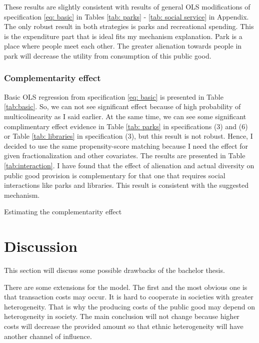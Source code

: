 \documentclass[letterpaper,11pt]{article}
\begin{document}
These results are slightly consistent with results of general OLS modifications of specification \ref{eq: basic} in Tables \ref{tab: parks} - \ref{tab: social service} in Appendix. The only robust result in both strategies is parks and recreational spending. This is the expenditure part that is ideal fits my mechanism explanation. Park is a place where people meet each other. The greater alienation towards people in park will decrease the utility from consumption of this public good.

\subsubsection{Complementarity effect}
\label{subsec: complement}

Basic OLS regression from specification \ref{eq: basic} is presented in Table \ref{tab:basic}. So, we can not see significant effect because of high probability of multicolinearity as I said earlier. At the same time, we can see some significant complimentary effect evidence in Table \ref{tab: parks} in specifications (3) and (6) or Table \ref{tab: libraries} in specification (3), but this result is not robust. Hence, I decided to use the same propensity-score matching because I need the effect for given fractionalization and other covariates. The results are presented in Table \ref{tab:interaction}. I have found that the effect of alienation and actual diversity on public good provision is complementary for that one that requires social interactions like parks and libraries. This result is consistent with the suggested mechanism.

\begin{table}[H]
    \centering
    \footnotesize
    
    \caption{Estimating the complementarity effect}
    \label{tab:interaction}
\end{table}


\section{Discussion}

This section will discuss some possible drawbacks of the bachelor thesis.

There are some extensions for the model. The first and the most obvious one is that transaction costs may occur. It is hard to cooperate in societies with greater heterogeneity. That is why the producing costs of the public good may depend on heterogeneity in society. The main conclusion will not change because higher costs will decrease the provided amount so that ethnic heterogeneity will have another channel of influence.
\end{document}

